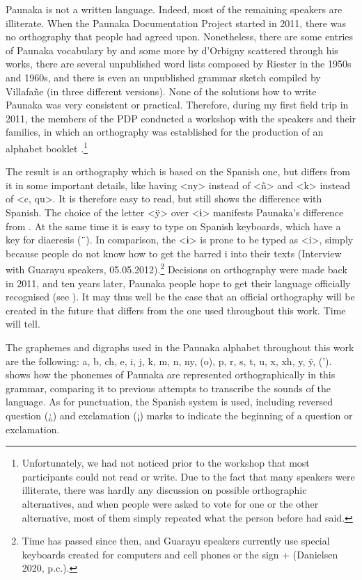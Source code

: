 Paunaka is not a written language. Indeed, most of the remaining speakers are illiterate. When the Paunaka Documentation Project started in 2011, there was no orthography that people had agreed upon. Nonetheless, there are some entries of Paunaka vocabulary by \citet[319]{Cardus1886} and some more by d’Orbigny %
scattered through his works, there are several unpublished word lists composed by Riester in the 1950s and 1960s, and there is even an unpublished grammar sketch compiled by Villafañe (in three different versions). None of the solutions how to write Paunaka was very consistent or practical. Therefore, during my first field trip in 2011, the members of the PDP conducted a workshop with the speakers and their families, in which an orthography was established for the production of an alphabet booklet \citep[cf.][]{PDP2012}.\footnote{Unfortunately, we had not noticed prior to the workshop that most participants could not read or write. Due to the fact that many speakers were illiterate, there was hardly any discussion on possible orthographic alternatives, and when people were asked to vote for one or the other alternative, most of them simply repeated what the person before had said.}  

The result is an orthography which is based on the Spanish one, but differs from it in some important details, like having <ny> instead of <ñ> and <k> instead of <c, qu>. It is therefore easy to read, but still shows the difference with Spanish.  The choice of the letter <ÿ> over <ɨ>  manifests Paunaka’s difference from . At the same time it is easy to type on Spanish keyboards, which have a key for diaeresis (¨). In comparison, the <ɨ> is prone to be typed as <i>, simply because people do not know how to get the barred i into their texts (Interview with Guarayu speakers, 05.05.2012).\footnote{Time has passed since then, and Guarayu speakers currently use special keyboards created for computers and cell phones or the sign + (Danielsen 2020, p.c.).} Decisions on orthography were made back in 2011, and ten years later, Paunaka people hope to get their language officially recognised (see ). It may thus well be the case that an official orthography will be created in the future that differs from the one used throughout this work. Time will tell.

The graphemes and digraphs used in the Paunaka alphabet throughout this work are the following: a, b, ch, e, i, j, k, m, n, ny, (o), p, r, s, t, u, x, xh, y, ÿ, (’).  shows how the phonemes of Paunaka are represented orthographically in this grammar, comparing it to previous attempts to transcribe the sounds of the language. As for punctuation, the Spanish system is used, including reversed question (¿) and exclamation (¡) marks to indicate the beginning of a question or exclamation.

